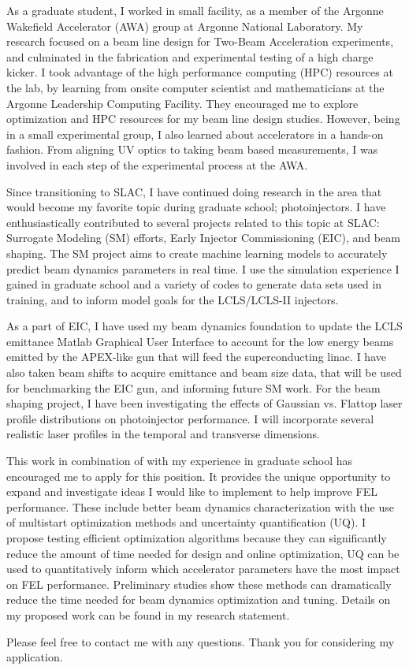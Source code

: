  As a graduate student, I worked in small facility, as a member of the Argonne Wakefield Accelerator (AWA) group
 at Argonne National Laboratory. My research focused on a beam line design for Two-Beam Acceleration experiments, and culminated
 in the fabrication and experimental testing of a high charge kicker. 
 I took advantage of the  high performance computing (HPC) resources at the lab, by learning from onsite computer scientist
 and mathematicians at the Argonne Leadership Computing Facility. 
 They encouraged me to explore optimization and HPC resources for my 
 beam line design studies. However, being in a small experimental group, 
 I also learned about accelerators in a hands-on fashion. From aligning UV optics
 to taking beam based measurements, I was involved in each step of the experimental process at the AWA.


Since transitioning to SLAC, 
I have continued doing research in the area that
 would become my favorite topic during graduate school; photoinjectors.
 I have enthusiastically contributed to several projects related to this topic at SLAC:
 Surrogate Modeling (SM) efforts, Early Injector Commissioning (EIC), and beam shaping. 
 The SM project aims to create machine learning models to accurately predict 
 beam dynamics parameters in real time. 
 I use the simulation experience I gained in graduate school and a variety of codes to generate data sets used in training, 
 and to inform model goals for the LCLS/LCLS-II injectors.
 
 As a part of EIC, I have used my beam dynamics foundation to update the 
 LCLS emittance Matlab Graphical User Interface to account for the low energy beams emitted by the 
 APEX-like gun that will feed the superconducting linac. I have also  
 taken beam shifts to acquire emittance and beam size data, that will be used 
 for benchmarking the EIC gun, and informing future SM work.
 For the beam shaping project, I have been investigating the effects of Gaussian vs. 
 Flattop laser profile distributions on photoinjector performance. 
 I will incorporate several realistic laser profiles in the temporal and transverse dimensions. 
 
 This work in combination of with my experience in graduate school has encouraged me 
 to apply for this position. It provides the unique opportunity to expand and investigate ideas 
 I would like to implement to help improve FEL performance. 
 These include better beam dynamics characterization with the use of multistart optimization methods and uncertainty quantification (UQ). 
I propose testing efficient optimization algorithms because they can significantly reduce the amount of time needed for design and online optimization, 
 UQ can be used to quantitatively inform  which accelerator parameters have the most impact on FEL performance. 
 Preliminary studies show these methods can dramatically reduce the time needed for beam dynamics optimization and tuning. 
 Details on my proposed work can be found in my research statement.
 
 Please feel free to contact me with any questions. Thank you for considering my application. 
 \vspace{0.5em}
 